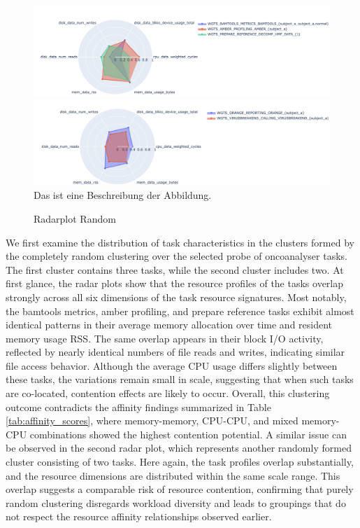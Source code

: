\begin{figure}[H]
    \caption{Radarplot Random}
    \includegraphics[scale=0.45]{fig/06/06-radarplot-random.png}
    \includegraphics[scale=0.45]{fig/06/06-radarplot-random-2.png}
    \label{fig:radarplot_random}
    \newline
    \tiny
    Das ist eine Beschreibung der Abbildung.
\end{figure}

We first examine the distribution of task characteristics in the clusters formed by the completely random clustering over the selected probe of oncoanalyser tasks. The first cluster contains three tasks, while the second cluster includes two. At first glance, the radar plots show that the resource profiles of the tasks overlap strongly across all six dimensions of the task resource signatures. Most notably, the bamtools metrics, amber profiling, and prepare reference tasks exhibit almost identical patterns in their average memory allocation over time and resident memory usage RSS. The same overlap appears in their block I/O activity, reflected by nearly identical numbers of file reads and writes, indicating similar file access behavior.
Although the average CPU usage differs slightly between these tasks, the variations remain small in scale, suggesting that when such tasks are co-located, contention effects are likely to occur. Overall, this clustering outcome contradicts the affinity findings summarized in Table \ref{tab:affinity_scores}, where memory-memory, CPU-CPU, and mixed memory-CPU combinations showed the highest contention potential.
A similar issue can be observed in the second radar plot, which represents another randomly formed cluster consisting of two tasks. Here again, the task profiles overlap substantially, and the resource dimensions are distributed within the same scale range. This overlap suggests a comparable risk of resource contention, confirming that purely random clustering disregards workload diversity and leads to groupings that do not respect the resource affinity relationships observed earlier.

